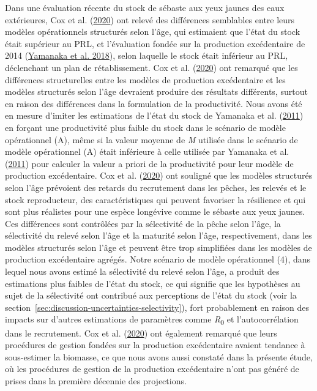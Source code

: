 \documentclass[french,11pt]{book}
\begin{document}
Dans une évaluation récente du stock de sébaste aux yeux jaunes des eaux extérieures, Cox et al. (\protect\hyperlink{ref-cox2020}{2020}) ont relevé des différences semblables entre leurs modèles opérationnels structurés selon l'âge, qui estimaient que l'état du stock était supérieur au PRL, et l'évaluation fondée sur la production excédentaire de 2014 (\protect\hyperlink{ref-yamanaka2018yelloweyeoutside}{Yamanaka et al. 2018}), selon laquelle le stock était inférieur au PRL, déclenchant un plan de rétablissement. Cox et al. (\protect\hyperlink{ref-cox2020}{2020}) ont remarqué que les différences structurelles entre les modèles de production excédentaire et les modèles structurés selon l'âge devraient produire des résultats différents, surtout en raison des différences dans la formulation de la productivité. Nous avons été en mesure d'imiter les estimations de l'état du stock de Yamanaka et al. (\protect\hyperlink{ref-yamanaka2011}{2011}) en forçant une productivité plus faible du stock dans le scénario de modèle opérationnel (A), même si la valeur moyenne de \emph{M} utilisée dans le scénario de modèle opérationnel (A) était inférieure à celle utilisée par Yamanaka et al. (\protect\hyperlink{ref-yamanaka2011}{2011}) pour calculer la valeur a priori de la productivité pour leur modèle de production excédentaire. Cox et al. (\protect\hyperlink{ref-cox2020}{2020}) ont souligné que les modèles structurés selon l'âge prévoient des retards du recrutement dans les pêches, les relevés et le stock reproducteur, des caractéristiques qui peuvent favoriser la résilience et qui sont plus réalistes pour une espèce longévive comme le sébaste aux yeux jaunes. Ces différences sont contrôlées par la sélectivité de la pêche selon l'âge, la sélectivité du relevé selon l'âge et la maturité selon l'âge, respectivement, dans les modèles structurés selon l'âge et peuvent être trop simplifiées dans les modèles de production excédentaire agrégés. Notre scénario de modèle opérationnel (4), dans lequel nous avons estimé la sélectivité du relevé selon l'âge, a produit des estimations plus faibles de l'état du stock, ce qui signifie que les hypothèses au sujet de la sélectivité ont contribué aux perceptions de l'état du stock (voir la section~\ref{sec:discussion-uncertainties-selectivity}), fort probablement en raison des impacts sur d'autres estimations de paramètres comme \emph{R}\textsubscript{0} et l'autocorrélation dans le recrutement. Cox et al. (\protect\hyperlink{ref-cox2020}{2020}) ont également remarqué que leurs procédures de gestion fondées sur la production excédentaire avaient tendance à sous-estimer la biomasse, ce que nous avons aussi constaté dans la présente étude, où les procédures de gestion de la production excédentaire n'ont pas généré de prises dans la première décennie des projections.
\end{document}
